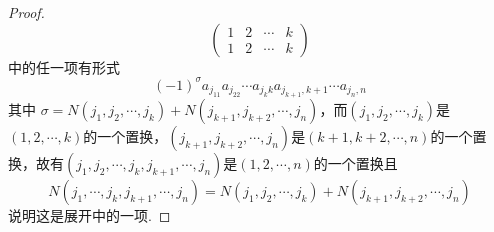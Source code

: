 {\begin{proof}
\[\begin{pmatrix}
                1 & 2 & \cdots & k \\
                1 & 2 & \cdots & k
            \end{pmatrix}
        \]
        中的任一项有形式
        \[
            \left(-1\right)^{\sigma}
            a_{j_11}a_{j_22}\cdots
            a_{j_kk}a_{j_{k+1},k+1}\cdots
            a_{j_n,n}
        \]
        其中
        $\sigma =N\left(
            j_1,j_2,\cdots,j_k
            \right)+N\left(
            j_{k+1},j_{k+2},\cdots,j_n
            \right)$，而$\left(j_1,j_2,\cdots,j_k\right)$是$\left(1,2,\cdots,k\right)$的一个置换，$\left(j_{k + 1},j_{k+2},\cdots,j_n\right)$是$\left(k+1,k+2,\cdots,n\right)$的一个置换，故有$\left(
            j_1,j_2,\cdots,j_k,j_{k+1},\cdots,j_n
            \right)$是$\left(1,2,\cdots,n\right)$的一个置换且
        \[
            N\left(j_1,\cdots,j_k,j_{k+1},\cdots,j_n\right)
            =N\left(j_1,j_2,\cdots,j_k\right)+
            N\left(j_{k+1},j_{k+2},\cdots,j_n\right)
        \]
        说明这是展开中的一项.


\end{proof}}
